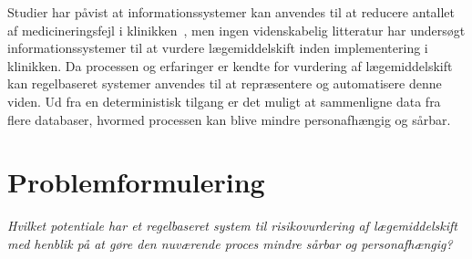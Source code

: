 Studier har påvist at informationssystemer kan anvendes til at reducere antallet af medicineringsfejl i klinikken~\citep{Agrawal2009, Stenner2010, Fischer2008, Simpson2008}, men ingen videnskabelig litteratur har undersøgt informationssystemer til at vurdere lægemiddelskift inden implementering i klinikken. Da processen og erfaringer er kendte for vurdering af lægemiddelskift kan regelbaseret systemer anvendes til at repræsentere og automatisere denne viden. Ud fra en deterministisk tilgang er det muligt at sammenligne data fra flere databaser, hvormed processen kan blive mindre personafhængig og sårbar.

\section{Problemformulering}
\textit{Hvilket potentiale har et regelbaseret system til risikovurdering af lægemiddelskift med henblik på at gøre den nuværende proces mindre sårbar og personafhængig?}




